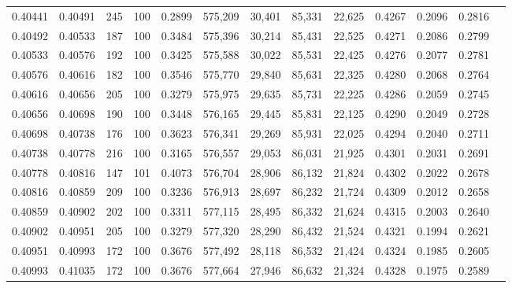 \begin{tabular}{rrrrrrrrrrrrr}
0.40441 & 0.40491 &   245 & 100 &                                     0.2899 & 575,209 &  30,401 &  85,331 &  22,625 & 0.4267 & 0.2096 & 0.2816 \\
0.40492 & 0.40533 &   187 & 100 &                                     0.3484 & 575,396 &  30,214 &  85,431 &  22,525 & 0.4271 & 0.2086 & 0.2799 \\
0.40533 & 0.40576 &   192 & 100 &                                     0.3425 & 575,588 &  30,022 &  85,531 &  22,425 & 0.4276 & 0.2077 & 0.2781 \\
0.40576 & 0.40616 &   182 & 100 &                                     0.3546 & 575,770 &  29,840 &  85,631 &  22,325 & 0.4280 & 0.2068 & 0.2764 \\
0.40616 & 0.40656 &   205 & 100 &                                     0.3279 & 575,975 &  29,635 &  85,731 &  22,225 & 0.4286 & 0.2059 & 0.2745 \\
0.40656 & 0.40698 &   190 & 100 &                                     0.3448 & 576,165 &  29,445 &  85,831 &  22,125 & 0.4290 & 0.2049 & 0.2728 \\
0.40698 & 0.40738 &   176 & 100 &                                     0.3623 & 576,341 &  29,269 &  85,931 &  22,025 & 0.4294 & 0.2040 & 0.2711 \\
0.40738 & 0.40778 &   216 & 100 &                                     0.3165 & 576,557 &  29,053 &  86,031 &  21,925 & 0.4301 & 0.2031 & 0.2691 \\
0.40778 & 0.40816 &   147 & 101 &                                     0.4073 & 576,704 &  28,906 &  86,132 &  21,824 & 0.4302 & 0.2022 & 0.2678 \\
0.40816 & 0.40859 &   209 & 100 &                                     0.3236 & 576,913 &  28,697 &  86,232 &  21,724 & 0.4309 & 0.2012 & 0.2658 \\
0.40859 & 0.40902 &   202 & 100 &                                     0.3311 & 577,115 &  28,495 &  86,332 &  21,624 & 0.4315 & 0.2003 & 0.2640 \\
0.40902 & 0.40951 &   205 & 100 &                                     0.3279 & 577,320 &  28,290 &  86,432 &  21,524 & 0.4321 & 0.1994 & 0.2621 \\
0.40951 & 0.40993 &   172 & 100 &                                     0.3676 & 577,492 &  28,118 &  86,532 &  21,424 & 0.4324 & 0.1985 & 0.2605 \\
0.40993 & 0.41035 &   172 & 100 &                                     0.3676 & 577,664 &  27,946 &  86,632 &  21,324 & 0.4328 & 0.1975 & 0.2589 \\

\end{tabular}
